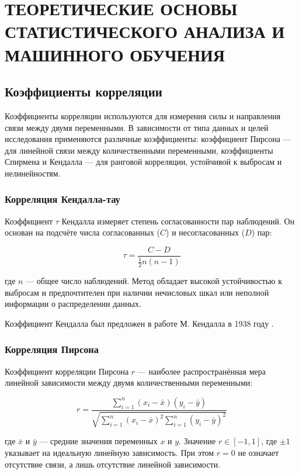\section{ТЕОРЕТИЧЕСКИЕ ОСНОВЫ СТАТИСТИЧЕСКОГО АНАЛИЗА И МАШИННОГО ОБУЧЕНИЯ}

\subsection{Коэффициенты корреляции}

Коэффициенты корреляции используются для измерения силы и направления связи между двумя переменными. В зависимости от типа данных и целей исследования применяются различные коэффициенты: коэффициент Пирсона — для линейной связи между количественными переменными, коэффициенты Спирмена и Кендалла — для ранговой корреляции, устойчивой к выбросам и нелинейностям.

\subsubsection{Корреляция Кендалла-тау}

Коэффициент $\tau$ Кендалла измеряет степень согласованности пар наблюдений. Он основан на подсчёте числа согласованных ($C$) и несогласованных ($D$) пар:

\[
\tau = \frac{C - D}{\frac{1}{2}n(n-1)}
\]

где $n$ — общее число наблюдений. Метод обладает высокой устойчивостью к выбросам и предпочтителен при наличии нечисловых шкал или неполной информации о распределении данных.

Коэффициент Кендалла был предложен в работе М. Кендалла в 1938 году \cite{kenda1938}.

\subsubsection{Корреляция Пирсона}

Коэффициент корреляции Пирсона $r$ — наиболее распространённая мера линейной зависимости между двумя количественными переменными:

\[
r = \frac{\sum_{i=1}^{n}(x_i - \bar{x})(y_i - \bar{y})}{\sqrt{\sum_{i=1}^{n}(x_i - \bar{x})^2 \sum_{i=1}^{n}(y_i - \bar{y})^2}}
\]

где $\bar{x}$ и $\bar{y}$ — средние значения переменных $x$ и $y$. Значение $r \in [-1, 1]$, где $\pm1$ указывает на идеальную линейную зависимость. При этом $r = 0$ не означает отсутствие связи, а лишь отсутствие линейной зависимости.

